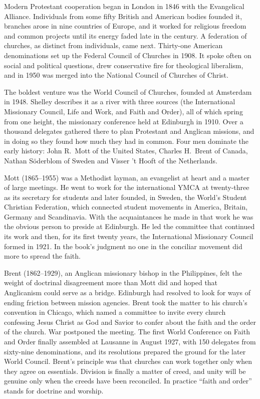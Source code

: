 Modern Protestant cooperation began in London in 1846 with the Evangelical Alliance. Individuals from
some fifty British and American bodies founded it, branches arose in nine countries of Europe, and it
worked for religious freedom and common projects until its energy faded late in the century. A
federation of churches, as distinct from individuals, came next. Thirty-one American denominations
set up the Federal Council of Churches in 1908. It spoke often on social and political questions,
drew conservative fire for theological liberalism, and in 1950 was merged into the National Council
of Churches of Christ.

The boldest venture was the World Council of Churches, founded at Amsterdam in 1948. Shelley
describes it as a river with three sources (the International Missionary Council, Life and Work, and
Faith and Order), all of which spring from one height, the missionary conference held at Edinburgh in
1910. Over a thousand delegates gathered there to plan Protestant and Anglican missions, and in doing
so they found how much they had in common. Four men dominate the early history: John R.~Mott of the
United States, Charles H.~Brent of Canada, Nathan S\"oderblom of Sweden and Visser 't Hooft of the
Netherlands.

Mott (1865--1955) was a Methodist layman, an evangelist at heart and a master of large meetings. He
went to work for the international YMCA at twenty-three as its secretary for students and later
founded, in Sweden, the World's Student Christian Federation, which connected student movements in
America, Britain, Germany and Scandinavia. With the acquaintances he made in that work he was the
obvious person to preside at Edinburgh. He led the committee that continued its work and then, for
its first twenty years, the International Missionary Council formed in 1921. In the book's judgment
no one in the conciliar movement did more to spread the faith.

Brent (1862--1929), an Anglican missionary bishop in the Philippines, felt the weight of doctrinal
disagreement more than Mott did and hoped that Anglicanism could serve as a bridge. Edinburgh had
resolved to look for ways of ending friction between mission agencies. Brent took the matter to his
church's convention in Chicago, which named a committee to invite every church confessing Jesus
Christ as God and Savior to confer about the faith and the order of the church. War postponed the
meeting. The first World Conference on Faith and Order finally assembled at Lausanne in August 1927,
with 150 delegates from sixty-nine denominations, and its resolutions prepared the ground for the
later World Council. Brent's principle was that churches can work together only when they agree on
essentials. Division is finally a matter of creed, and unity will be genuine only when the creeds
have been reconciled. In practice ``faith and order'' stands for doctrine and worship.

